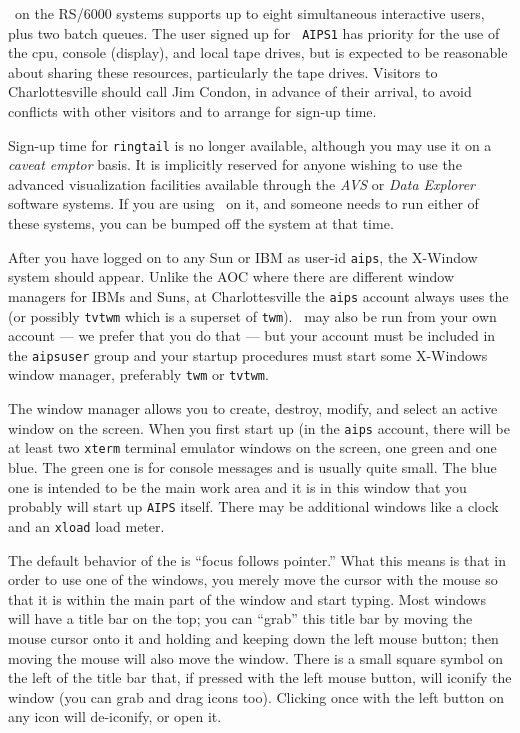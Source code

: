      \AIPS\ on the RS/6000 systems supports up to eight simultaneous
interactive users, plus two batch queues.  The user signed up for {\tt
AIPS1} has priority for the use of the cpu, console (display), and
local tape drives, but is expected to be reasonable about sharing
these resources, particularly the tape drives.  Visitors to
Charlottesville should call Jim Condon, in advance of their arrival,
to avoid conflicts with other visitors and to arrange for sign-up time.

     Sign-up time for {\tt ringtail} is no longer available, although
you may use it on a {\it caveat emptor\/} basis.  It is implicitly
reserved for anyone wishing to use the advanced visualization
facilities available through the {\it AVS\/} or {\it Data Explorer\/}
software systems.  If you are using \AIPS\ on it, and someone needs to
run either of these systems, you can be bumped off the system at that
time.


     After you have logged on to any Sun or IBM as user-id {\tt aips},
the X-Window system should appear.  Unlike the AOC where there are
different window managers for IBMs and Suns, at Charlottesville the
{\tt aips} account always uses the {\tt {}}  (or possibly {\tt tvtwm} which is a superset of {\tt twm}).
\AIPS\ may also be run from your own account --- we prefer that you do
that --- but your account must be included in the {\tt aipsuser} group
and your startup procedures must start some X-Windows window manager,
preferably {\tt twm} or {\tt tvtwm}.

\eject

     The window manager allows you to create, destroy, modify, and
select an active window on the screen.  When you first start up (in
the {\tt aips} account, there will be at least two {\tt xterm}
terminal emulator windows on the screen, one green and one blue.  The
green one is for console messages and is usually quite small.  The
blue one is intended to be the main work area and it is in this window
that you probably will start up {\tt AIPS} itself.  There may be
additional windows like a clock and an {\tt xload} load meter.

     The default behavior of the  is ``focus
follows pointer.''  What this means is that in order to use one of the
windows, you merely move the cursor with the mouse so that it is
within the main part of the window and start typing.  Most windows
will have a title bar on the top; you can ``grab'' this title bar by
moving the mouse cursor onto it and holding and keeping down the left
mouse button; then moving the mouse will also move the window.  There
is a small  square symbol on the left of the title bar that, if
pressed with the left mouse button, will iconify the window (you can
grab and drag icons too).  Clicking once with the left 
button on any icon will de-iconify, or open it.

